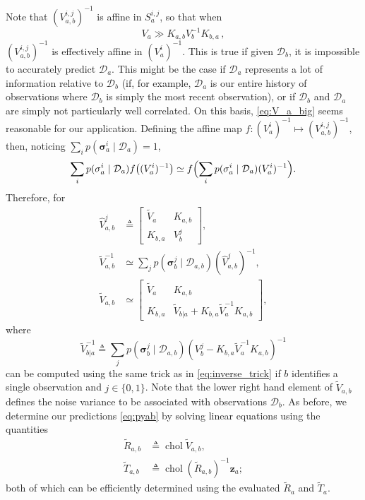 \documentclass{article}
\newcommand{\given}{\ensuremath{\mid}}
\newcommand{\cm}[1]{\ensuremath{\mathcal{#1}}}
\newcommand{\bm}[1]{\ensuremath{\mathbf{#1}}}
\newcommand{\data}{\ensuremath{\cm{D}}}
\newcommand{\vect}[1]{\bm{#1}}
\newcommand{\vz}{\vect{z}}
\newcommand{\vs}{\vect{\sigma}}
\newcommand{\fPr}{p}
\newcommand{\Prob}[2]{\fPr(#1 \given #2 )}
\newcommand{\defequal}{\triangleq}
\DeclareMathOperator{\chol}{chol}
\begin{document}
Note that $({V}^{i,j}_{a,b})^{-1}$ is affine in $S^{i,j}_a$, so that when
\begin{equation}\label{eq:V_a_big}
 V_a \gg K_{a,b} V_b^{-1} K_{b,a}\,,
\end{equation}
$({V}^{i,j}_{a,b})^{-1}$ is effectively affine in $(V^i_a)^{-1}$. This
is true if given $\data_b$, it is impossible to accurately predict
$\data_a$. This might be the case if $\data_a$ represents a lot of
information relative to $\data_b$ (if, for example, $\data_a$ is our
entire history of observations where $\data_b$ is simply the most
recent observation), or if $\data_b$ and $\data_a$ are simply not
particularly well correlated. On this basis, \eqref{eq:V_a_big} seems
reasonable for our application. Defining the affine map $f\colon (V^i_a)^{-1}
\mapsto ({V}^{i,j}_{a,b})^{-1}$, then, noticing $\sum_i \Prob{\vs^i_{a}}{\data_{a}} = 1$,
$$
\sum_i \Prob{\vs^i_{a}}{\data_{a}} f\bigl((V^i_a)^{-1} \bigr) \simeq f\Bigl(\sum_i \Prob{\vs^i_{a}}{\data_{a}}(V^i_a)^{-1} \Bigr).
$$
Therefore, for
\begin{align*}
\hat{V}^{j}_{a,b} & \defequal
\begin{bmatrix}
 \tilde{V}_a & K_{a,b}\\
 K_{b,a} & V^j_b
\end{bmatrix},
\\
\tilde{V}^{-1}_{a,b} &\simeq \sum_j \Prob{\vs^j_{b}}{\data_{a,b}} (\hat{V}^{j}_{a,b})^{-1},
\nonumber\\
\tilde{V}_{a,b} & \simeq
\begin{bmatrix}
 \tilde{V}_a & K_{a,b}\\
 K_{b,a} & \tilde{V}_{b|a} + K_{b,a} \tilde{V}_a^{-1} K_{a,b}
\end{bmatrix},
\end{align*}
where
\begin{equation*}
 \tilde{V}^{-1}_{b|a} \defequal \sum_j \Prob{\vs^j_{b}}{\data_{a,b}} (V^j_b -K_{b,a} \tilde{V}_a^{-1}K_{a,b})^{-1}
\end{equation*}
can be computed using the same trick as in \eqref{eq:inverse_trick} if
$b$ identifies a single observation and $j\in\{0,1\}$. Note that the
lower right hand element of $\tilde{V}_{a,b}$ defines the noise
variance to be associated with observations $\data_b$. As before, we
determine our predictions \eqref{eq:pyab} by solving linear equations
using the quantities
\begin{align}
 \tilde{R}_{a,b} & \defequal \chol \tilde{V}_{a,b} \label{eq:Rab}, \\
 \tilde{T}_{a,b} & \defequal \chol (\tilde{R}_{a,b})^{-1} \vz_a \label{eq:Tab};
\end{align}
both of which can be efficiently determined \citep[Appendix
  B]{osbornebayesian} using the evaluated $\tilde{R}_a$ and
$\tilde{T}_a$.
\end{document}
